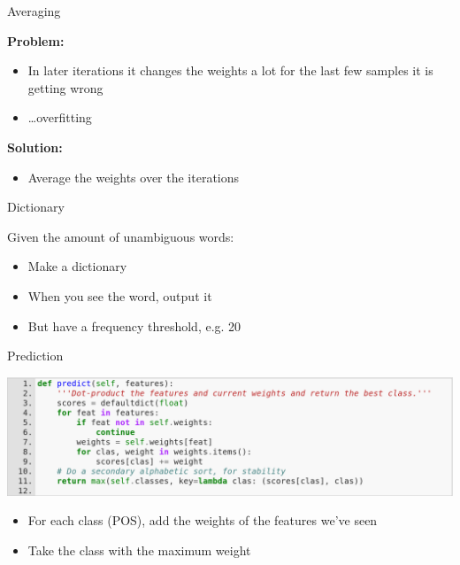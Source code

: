 \documentclass{beamer}
\begin{document}
\begin{frame}{Averaging}

\textbf{Problem:}
\begin{itemize}
  \item In later iterations it changes the weights a lot for the last few
    samples it is getting wrong
  \item \ldots overfitting
\end{itemize}

\textbf{Solution:}
\begin{itemize}
  \item Average the weights over the iterations
\end{itemize}

\end{frame}

\begin{frame}{Dictionary}

Given the amount of unambiguous words:
\begin{itemize}
  \item Make a dictionary
  \item When you see the word, output it
  \item But have a frequency threshold, e.g. 20
\end{itemize}

\end{frame}

\begin{frame}{Prediction}

\begin{center}
\includegraphics[width=\textwidth]{images/perceptron-predict.png}
\end{center}

\begin{itemize}
  \item For each class (POS), add the weights of the features we've seen
  \item Take the class with the maximum weight
\end{itemize}

\end{frame}
\end{document}
